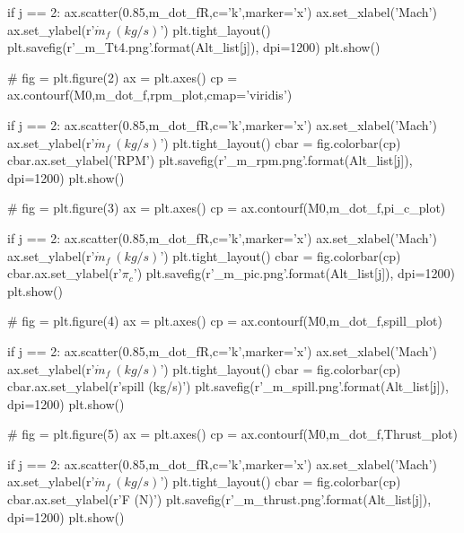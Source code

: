 \documentclass[journal ]{new-aiaa}
\begin{document}
\begin{python}
if j == 2:
    ax.scatter(0.85,m_dot_fR,c='k',marker='x')
ax.set_xlabel('Mach')
ax.set_ylabel(r'$\dot{m}_f \ (kg/s)$')
plt.tight_layout()
plt.savefig(r'{}_m_Tt4.png'.format(Alt_list[j]), dpi=1200)
plt.show()

# %
fig = plt.figure(2)
ax = plt.axes()
cp = ax.contourf(M0,m_dot_f,rpm_plot,cmap='viridis')

if j == 2:
    ax.scatter(0.85,m_dot_fR,c='k',marker='x')
ax.set_xlabel('Mach')
ax.set_ylabel(r'$\dot{m}_f \ (kg/s)$')
plt.tight_layout()
cbar = fig.colorbar(cp)
cbar.ax.set_ylabel('RPM')
plt.savefig(r'{}_m_rpm.png'.format(Alt_list[j]), dpi=1200)
plt.show()

# %
fig = plt.figure(3)
ax = plt.axes()
cp = ax.contourf(M0,m_dot_f,pi_c_plot)

if j == 2:
    ax.scatter(0.85,m_dot_fR,c='k',marker='x')
ax.set_xlabel('Mach')
ax.set_ylabel(r'$\dot{m}_f \ (kg/s)$')
plt.tight_layout()
cbar = fig.colorbar(cp)
cbar.ax.set_ylabel(r'$\pi_c$')
plt.savefig(r'{}_m_pic.png'.format(Alt_list[j]), dpi=1200)
plt.show()

# %
fig = plt.figure(4)
ax = plt.axes()
cp = ax.contourf(M0,m_dot_f,spill_plot)

if j == 2:
    ax.scatter(0.85,m_dot_fR,c='k',marker='x')
ax.set_xlabel('Mach')
ax.set_ylabel(r'$\dot{m}_f \ (kg/s)$')
plt.tight_layout()
cbar = fig.colorbar(cp)
cbar.ax.set_ylabel(r'spill (kg/s)')
plt.savefig(r'{}_m_spill.png'.format(Alt_list[j]), dpi=1200)
plt.show()

# %
fig = plt.figure(5)
ax = plt.axes()
cp = ax.contourf(M0,m_dot_f,Thrust_plot)

if j == 2:
    ax.scatter(0.85,m_dot_fR,c='k',marker='x')
ax.set_xlabel('Mach')
ax.set_ylabel(r'$\dot{m}_f \ (kg/s)$')
plt.tight_layout()
cbar = fig.colorbar(cp)
cbar.ax.set_ylabel(r'F (N)')
plt.savefig(r'{}_m_thrust.png'.format(Alt_list[j]), dpi=1200)
plt.show()
    \end{python}
    
\end{document}
